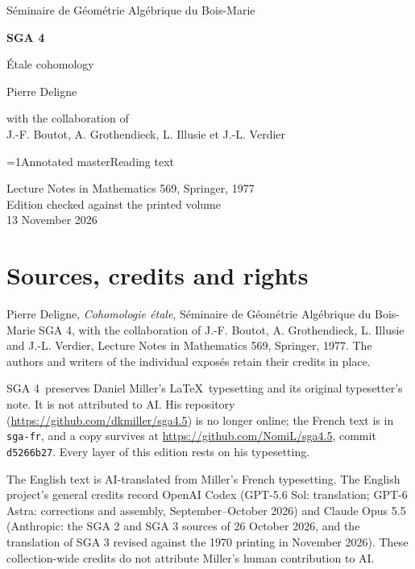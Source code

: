 \documentclass[oneside]{book}
\theoremstyle{sga-source}
\theoremstyle{sga-source-dash}
\theoremstyle{sga-source-dotdash}
\theoremstyle{sga-source-number-note-dash}
\theoremstyle{sga-source-note-number-dotdash}
\theoremstyle{sga-source-example-dotdash}
\theoremstyle{sga-source-inline-number}
\theoremstyle{sga-source-bare-number}
\theoremstyle{sga-source}
\providecommand\EditionIsMaster{0}
\begin{document}
\begin{titlepage}
\centering
\vspace*{2cm}
{\Large Séminaire de Géométrie Algébrique du Bois-Marie\par}
\vspace{0.7cm}
{\Huge\bfseries SGA 4\textonehalf\par}
\vspace{0.8cm}
{\huge Étale cohomology\par}
\vspace{1cm}
{\Large Pierre Deligne\par}
\vspace{0.5cm}
with the collaboration of\\[0.3em]
J.-F. Boutot, A. Grothendieck, L. Illusie et J.-L. Verdier
\vfill
{\Large \ifnum\EditionIsMaster=1\relax Annotated master\else Reading text\fi\par}
\vspace{0.7cm}
Lecture Notes in Mathematics 569, Springer, 1977\\[0.4em]
Edition checked against the printed volume\\
13 November 2026
\end{titlepage}

\chapter*{Sources, credits and rights}
Pierre Deligne, \emph{Cohomologie étale}, Séminaire de Géométrie Algébrique
du Bois-Marie SGA 4\textonehalf, with the collaboration of J.-F. Boutot,
A. Grothendieck, L. Illusie and J.-L. Verdier, Lecture Notes in Mathematics
569, Springer, 1977. The authors and writers of the individual exposés
retain their credits in place.

\medskip
SGA 4\textonehalf\ preserves Daniel Miller’s \LaTeX\ typesetting and its
original typesetter’s note. It is not attributed to AI. His repository
(\url{https://github.com/dkmiller/sga4.5}) is no longer online; the French
text is in \texttt{sga-fr}, and a copy survives at
\url{https://github.com/NomiL/sga4.5}, commit \texttt{d5266b27}.
Every layer of this edition rests on his typesetting.

\medskip
The English text is AI-translated from Miller’s French typesetting.
The English project’s general credits record OpenAI Codex (GPT-5.6 Sol:
translation; GPT-6 Astra: corrections and assembly, September--October
2026) and Claude Opus 5.5 (Anthropic: the SGA 2 and SGA 3 sources of
26 October 2026, and the translation of SGA 3 revised against the 1970
printing in November 2026). These collection-wide credits do not attribute
Miller’s human contribution to AI.
\end{document}
